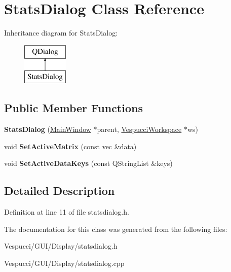 \hypertarget{class_stats_dialog}{}\section{Stats\+Dialog Class Reference}
\label{class_stats_dialog}
Inheritance diagram for Stats\+Dialog\+:\begin{figure}[H]
\begin{center}
\leavevmode
\includegraphics[height=2.000000cm]{class_stats_dialog}
\end{center}
\end{figure}
\subsection*{Public Member Functions}
\begin{DoxyCompactItemize}
\item 
{\bfseries Stats\+Dialog} (\hyperlink{class_main_window}{Main\+Window} $\ast$parent, \hyperlink{class_vespucci_workspace}{Vespucci\+Workspace} $\ast$ws)\hypertarget{class_stats_dialog_a33404e7e33e8d09b955dd43a947989c8}{}\label{class_stats_dialog_a33404e7e33e8d09b955dd43a947989c8}

\item 
void {\bfseries Set\+Active\+Matrix} (const vec \&data)\hypertarget{class_stats_dialog_a0605e8ed11f330380c8416f2f5ee4620}{}\label{class_stats_dialog_a0605e8ed11f330380c8416f2f5ee4620}

\item 
void {\bfseries Set\+Active\+Data\+Keys} (const Q\+String\+List \&keys)\hypertarget{class_stats_dialog_a5d79d55ea7a7d0e3f0b01423100ac5ad}{}\label{class_stats_dialog_a5d79d55ea7a7d0e3f0b01423100ac5ad}

\end{DoxyCompactItemize}


\subsection{Detailed Description}


Definition at line 11 of file statsdialog.\+h.



The documentation for this class was generated from the following files\+:\begin{DoxyCompactItemize}
\item 
Vespucci/\+G\+U\+I/\+Display/statsdialog.\+h\item 
Vespucci/\+G\+U\+I/\+Display/statsdialog.\+cpp\end{DoxyCompactItemize}
